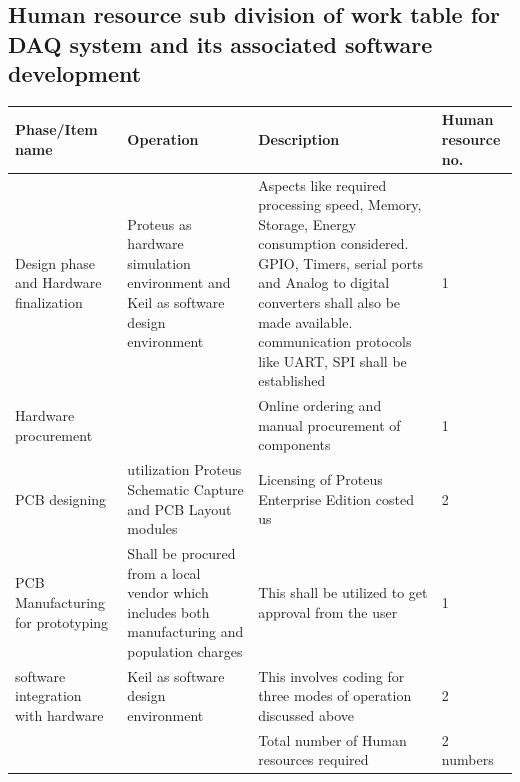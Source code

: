 \documentclass{FR16}
\begin{document}
\newpage
\subsection{Human resource sub division of work table for DAQ system and its associated software development}

\begin{center}
\begin{tabular}{||p{3 cm} ||p{4 cm}|| p{6 cm}|| |p{2 cm}|| }
\arrayrulecolor{Azzurro}
\hline
\hline

{\bfseries Phase/Item name } & {\bfseries Operation}& {\bfseries Description} & {\bfseries Human resource no.} \\
\hline
\hline
Design phase and Hardware finalization& Proteus as hardware simulation environment and Keil as
software design environment &  Aspects like required  processing speed, Memory, Storage, Energy consumption considered. GPIO, Timers, serial ports and Analog to digital converters shall also be made available. communication protocols like UART, SPI shall be established &1\\
\hline
\hline
Hardware procurement & &Online ordering and manual procurement of components & 1 \\
\hline
\hline
PCB designing & utilization Proteus Schematic Capture and PCB Layout modules  & Licensing of Proteus Enterprise Edition costed us&2\\ 
\hline 
\hline
PCB Manufacturing for prototyping & Shall be procured from a local vendor which includes both manufacturing and population charges & This shall be utilized to get approval from the user&1 \\
\hline 
\hline
software integration with hardware &Keil as
software design environment & This involves coding for three modes of operation discussed above  & 2\\
\hline
\hline
&  &Total number of Human resources required & 2 numbers
 
 \end{tabular}
\end{center}
\end{document}
